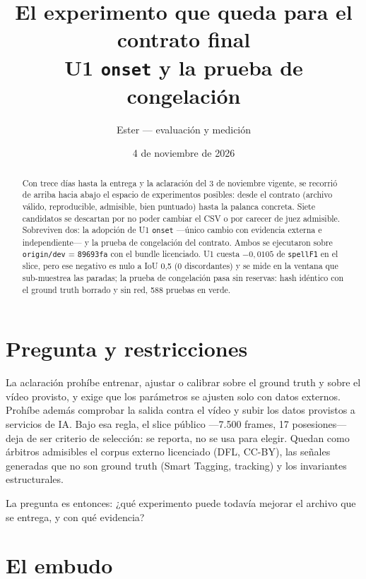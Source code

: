 \documentclass[11pt,a4paper]{article}
\title{El experimento que queda para el contrato final\\\large U1 \texttt{onset} y la prueba de congelación}
\author{Ester --- evaluación y medición}
\date{4 de noviembre de 2026}
\begin{document}
\maketitle

\begin{abstract}
Con trece días hasta la entrega y la aclaración del 3 de noviembre vigente, se recorrió de arriba
hacia abajo el espacio de experimentos posibles: desde el contrato (archivo válido, reproducible,
admisible, bien puntuado) hasta la palanca concreta. Siete candidatos se descartan por no poder
cambiar el CSV o por carecer de juez admisible. Sobreviven dos: la adopción de U1 \texttt{onset}
---único cambio con evidencia externa e independiente--- y la prueba de congelación del contrato.
Ambos se ejecutaron sobre \texttt{origin/dev} = \texttt{89693fa} con el bundle licenciado. U1 cuesta
$-0{,}0105$ de \texttt{spellF1} en el slice, pero ese negativo es nulo a IoU 0,5 (0 discordantes) y
se mide en la ventana que sub-muestrea las paradas; la prueba de congelación pasa sin reservas:
hash idéntico con el ground truth borrado y sin red, 588 pruebas en verde.
\end{abstract}

\section{Pregunta y restricciones}

La aclaración prohíbe entrenar, ajustar o calibrar sobre el ground truth y sobre el vídeo provisto,
y exige que los parámetros se ajusten solo con datos externos. Prohíbe además comprobar la salida
contra el vídeo y subir los datos provistos a servicios de IA. Bajo esa regla, el slice público
---7.500 frames, 17 posesiones--- deja de ser criterio de selección: se reporta, no se usa para
elegir. Quedan como árbitros admisibles el corpus externo licenciado (DFL, CC-BY), las señales
generadas que no son ground truth (Smart Tagging, tracking) y los invariantes estructurales.

La pregunta es entonces: ¿qué experimento puede todavía mejorar el archivo que se entrega, y con
qué evidencia?

\section{El embudo}
\end{document}
